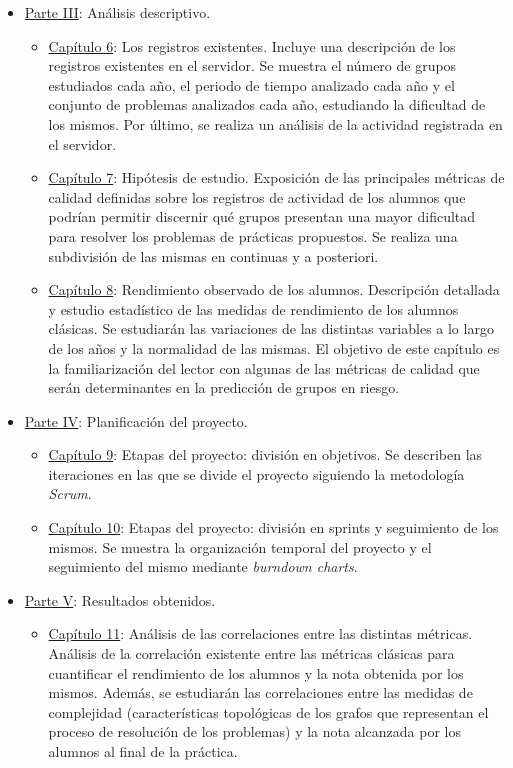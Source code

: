\begin{itemize}
\begin{itemize}
\end{itemize}
\item \hyperref[sec:parteIII]{Parte III}: Análisis descriptivo.
\begin{itemize}
\item \hyperref[sec:chapterVI]{Capítulo 6}: Los registros existentes.  Incluye una descripción de los registros existentes en el servidor. Se muestra el número de grupos estudiados cada año, el periodo de tiempo analizado cada año y el conjunto de problemas analizados cada año, estudiando la dificultad de los mismos. Por último, se realiza un análisis de la actividad registrada en el servidor.
\item \hyperref[sec:chapterVII]{Capítulo 7}: Hipótesis de estudio. Exposición de las principales métricas de calidad definidas sobre los registros de actividad de los alumnos que podrían permitir discernir qué grupos presentan una mayor dificultad para resolver los problemas de prácticas propuestos. Se realiza una subdivisión de las mismas en continuas y a posteriori.
\item \hyperref[chapter:rendimiento]{Capítulo 8}: Rendimiento observado de los alumnos. Descripción detallada y estudio estadístico de las medidas de rendimiento de los alumnos clásicas. Se estudiarán las variaciones de las distintas variables a lo largo de los años y la normalidad de las mismas. El objetivo de este capítulo es la familiarización del lector con algunas de las métricas de calidad que serán determinantes en la predicción de grupos en riesgo.
\end{itemize}
\item \hyperref[sec:parteIV]{Parte IV}: Planificación del proyecto.
\begin{itemize}
\item \hyperref[chapter:objetivos]{Capítulo 9}: Etapas del proyecto: división en objetivos. Se describen las iteraciones en las que se divide el proyecto siguiendo la metodología \emph{Scrum}.
\item \hyperref[chapter:sprints]{Capítulo 10}: Etapas del proyecto: división en sprints y seguimiento de los mismos. Se muestra la organización temporal del proyecto y el seguimiento del mismo mediante \emph{burndown charts}.
\end{itemize}
\item \hyperref[sec:parteV]{Parte V}: Resultados obtenidos.
\begin{itemize}
\item \hyperref[chapter:correlations]{Capítulo 11}: Análisis de las correlaciones entre las distintas métricas. Análisis de la correlación existente entre las métricas clásicas para cuantificar el rendimiento de los alumnos y la nota obtenida por los mismos. Además, se estudiarán las correlaciones entre las medidas de complejidad (características topológicas de los grafos que representan el proceso de resolución de los problemas) y la nota alcanzada por los alumnos al final de la práctica.

\end{itemize}
\end{itemize}
